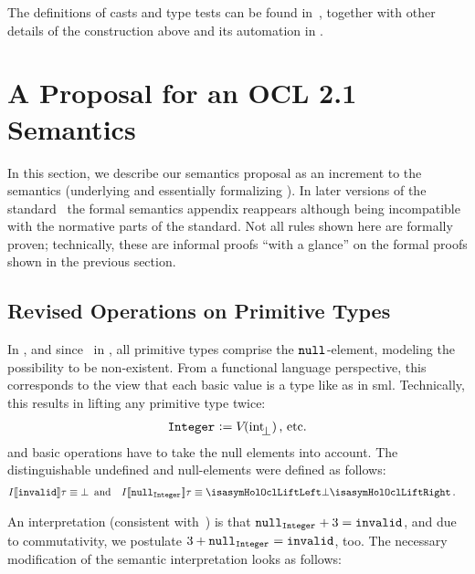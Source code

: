 The definitions of casts and type tests can be found
in~\cite{brucker.ea:extensible:2008-b}, together with other details of the
construction above and its automation in \holocl.

\section{A Proposal for an OCL 2.1 Semantics}\label{sec:hol-ocl2-semantics}
In this section, we describe our  semantics proposal as an increment to
the  semantics (underlying \holocl and essentially formalizing
\cite[Annex A]{omg:ocl:2003}). In later versions of the
standard~\cite{omg:ocl:2006} the formal semantics appendix reappears although
being incompatible with the normative parts of the standard.  Not all rules
shown here are formally proven; technically, these are informal proofs ``with a
glance'' on the formal proofs shown in the previous section.

\subsection{Revised Operations on Primitive Types}
In \UML, and since~\cite{omg:ocl:2006} in \OCL, all primitive types comprise the
$\Null{}$-element, modeling the possibility to be non-existent. From a
functional language perspective, this corresponds to the view that each basic
value is a type like  as in \acs{sml}. Technically, this
results in lifting any primitive type twice:
\begin{gather*}
  \OclInteger[]  \defeq \V{}{\up{\HolInteger}}\mi{, etc.}
\end{gather*}
and basic operations have to take the null elements into account. The
distinguishable undefined and null-elements were defined as follows:
\begin{align*}
 I\semantics{\OclUndef}\tau \equiv \bottom  &\mi{ and}  \quad
 I\semantics{\Null{\OclInteger[]}}\tau \equiv \lift{\bottom}\mi{.}
\end{align*}

An interpretation (consistent with~\cite{omg:ocl:2006}) is that
$\Null{\OclInteger[]} + 3 = \isasymOclInvalid$, and due to commutativity, we
postulate $3 + \Null{\OclInteger[]} = \isasymOclInvalid$, too.  The necessary
modification of the semantic interpretation looks as follows:

